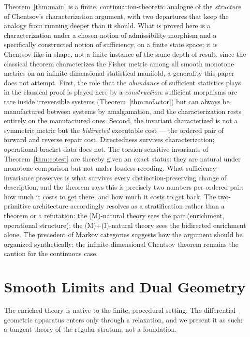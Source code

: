 \documentclass[11pt]{article}
\theoremstyle{remark}
\begin{document}
Theorem~\ref{thm:main} is a finite, continuation-theoretic analogue
of the \emph{structure} of Chentsov's characterization argument, with
two departures that keep the analogy from running deeper than it
should. What is proved here is a characterization under a chosen
notion of admissibility morphism and a specifically constructed
notion of sufficiency, on a finite state space; it is Chentsov-like
in shape, not a finite instance of the same depth of result, since
the classical theorem characterizes the Fisher metric among all
smooth monotone metrics on an infinite-dimensional statistical
manifold, a generality this paper does not attempt. First, the role
that the \emph{abundance} of sufficient statistics plays in the
classical proof is played here by a \emph{construction}: sufficient
morphisms are rare inside irreversible systems
(Theorem~\ref{thm:nofactor}) but can always be manufactured between
systems by amalgamation, and the characterization rests entirely on
the manufactured ones. Second, the invariant characterized is not a
symmetric metric but the \emph{bidirected} executable cost --- the
ordered pair of forward and reverse repair cost. Directedness
survives characterization;
operational-bracket data does not. The torsion-sensitive invariants of
Theorem~\ref{thm:cotest} are thereby given an exact status: they are
natural under monotone comparison but not under lossless recoding.
What sufficiency-invariance preserves is what survives every
distinction-preserving change of description, and the theorem says
this is precisely two numbers per ordered pair: how much it costs to
get there, and how much it costs to get back. The two-primitive
architecture accordingly resolves as a stratification rather than a
theorem or a refutation: the (M)-natural theory sees the pair
(enrichment, operational structure); the (M)+(I)-natural theory sees
the bidirected enrichment alone. The precedent of Markov categories
\cite{fritz} suggests how the argument should be organized
synthetically; the infinite-dimensional Chentsov theorem \cite{ajls}
remains the caution for the continuous case.

\section{Smooth Limits and Dual Geometry}\label{sec:smooth}

The enriched theory is native to the finite, procedural setting. The
differential-geometric apparatus enters only through a relaxation, and
we present it as such: a tangent theory of the regular stratum, not a
foundation.
\end{document}

